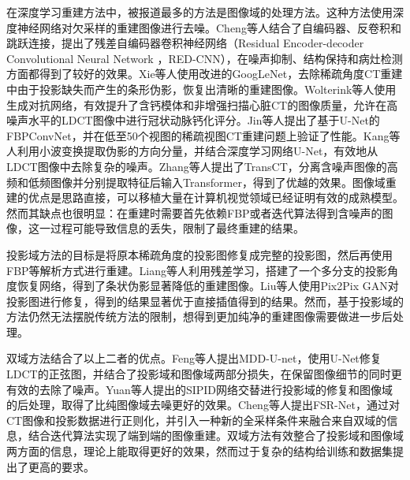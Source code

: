 在深度学习重建方法中，被报道最多的方法是图像域的处理方法。这种方法使用深度神经网络对欠采样的重建图像进行去噪。Cheng等人结合了自编码器、反卷积和跳跃连接，提出了残差自编码器卷积神经网络（Residual Encoder-decoder Convolutional Neural Network ，RED-CNN），在噪声抑制、结构保持和病灶检测方面都得到了较好的效果\cite{chenLowDoseCTResidual2017}。Xie等人使用改进的GoogLeNet\cite{szegedyGoingDeeperConvolutions2015}，去除稀疏角度CT重建中由于投影缺失而产生的条形伪影，恢复出清晰的重建图像\cite{xieArtifactRemovalUsing2018}。Wolterink等人使用生成对抗网络，有效提升了含钙模体和非增强扫描心脏CT的图像质量，允许在高噪声水平的LDCT图像中进行冠状动脉钙化评分\cite{wolterinkGenerativeAdversarialNetworks2017}。Jin等人提出了基于U-Net的FBPConvNet，并在低至50个视图的稀疏视图CT重建问题上验证了性能\cite{jinDeepConvolutionalNeural2017}。Kang等人利用小波变换提取伪影的方向分量，并结合深度学习网络U-Net，有效地从LDCT图像中去除复杂的噪声\cite{kangDeepConvolutionalNeural2017}。Zhang等人提出了TransCT，分离含噪声图像的高频和低频图像并分别提取特征后输入Transformer\cite{vaswaniAttentionAllYou2017}，得到了优越的效果\cite{zhangTransCTDualPathTransformer2021}。图像域重建的优点是思路直接，可以移植大量在计算机视觉领域已经证明有效的成熟模型。然而其缺点也很明显：在重建时需要首先依赖FBP或者迭代算法得到含噪声的图像，这一过程可能导致信息的丢失，限制了最终重建的结果。

投影域方法的目标是将原本稀疏角度的投影图修复成完整的投影图，然后再使用FBP等解析方式进行重建。Liang等人利用残差学习，搭建了一个多分支的投影角度恢复网络，得到了条状伪影显著降低的重建图像\cite{liangImproveAngularResolution2018}。Liu等人使用Pix2Pix GAN\cite{isolaImageToImageTranslationConditional2017}对投影图进行修复，得到的结果显著优于直接插值得到的结果\cite{liuSparsesamplingCTSinogram2020}。然而，基于投影域的方法仍然无法摆脱传统方法的限制，想得到更加纯净的重建图像需要做进一步后处理。

双域方法结合了以上二者的优点。Feng等人提出MDD-U-net，使用U-Net修复LDCT的正弦图，并结合了投影域和图像域两部分损失，在保留图像细节的同时更有效的去除了噪声\cite{fengPreliminaryStudyProjection2020a}。Yuan等人提出的SIPID网络交替进行投影域的修复和图像域的后处理，取得了比纯图像域去噪更好的效果\cite{yuanSIPIDDeepLearning2018}。Cheng等人提出FSR-Net，通过对CT图像和投影数据进行正则化，并引入一种新的全采样条件来融合来自双域的信息，结合迭代算法实现了端到端的图像重建\cite{chengLearnedFullSamplingReconstruction2020a}。双域方法有效整合了投影域和图像域两方面的信息，理论上能取得更好的效果，然而过于复杂的结构给训练和数据集提出了更高的要求。

